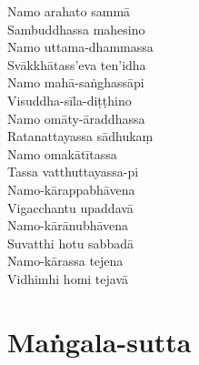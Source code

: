 
\begin{paritta}
Namo arahato sammā\\
Sambuddhassa mahesino\\
Namo uttama-dhammassa\\
Svākkhātass'eva ten'idha\\
Namo mahā-saṅghassāpi\\
Visuddha-sīla-diṭṭhino\\
Namo omāty-āraddhassa\\
Ratanattayassa sādhukaṃ\\
Namo omakātītassa\\
Tassa vatthuttayassa-pi\\
Namo-kārappabhāvena\\
Vigacchantu upaddavā\\
Namo-kārānubhāvena\\
Suvatthi hotu sabbadā\\
Namo-kārassa tejena\\
Vidhimhi homi tejavā

%

\end{paritta}

\clearpage

\chapter{Maṅgala-sutta}%


